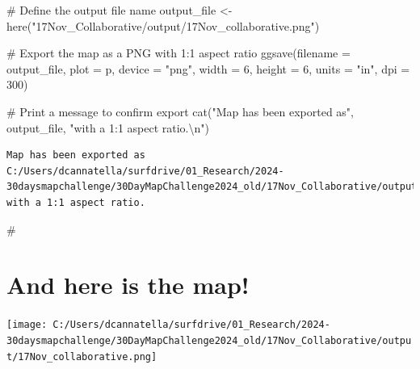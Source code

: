 \documentclass[
  letterpaper,
  DIV=11,
  numbers=noendperiod]{scrartcl}
\newenvironment{Shaded}{\begin{snugshade}}{\end{snugshade}}
\newcommand{\AttributeTok}[1]{\textcolor[rgb]{0.40,0.45,0.13}{#1}}
\newcommand{\CommentTok}[1]{\textcolor[rgb]{0.37,0.37,0.37}{#1}}
\newcommand{\DecValTok}[1]{\textcolor[rgb]{0.68,0.00,0.00}{#1}}
\newcommand{\FunctionTok}[1]{\textcolor[rgb]{0.28,0.35,0.67}{#1}}
\newcommand{\NormalTok}[1]{\textcolor[rgb]{0.00,0.23,0.31}{#1}}
\newcommand{\OtherTok}[1]{\textcolor[rgb]{0.00,0.23,0.31}{#1}}
\newcommand{\SpecialCharTok}[1]{\textcolor[rgb]{0.37,0.37,0.37}{#1}}
\newcommand{\StringTok}[1]{\textcolor[rgb]{0.13,0.47,0.30}{#1}}
\begin{document}
\begin{Shaded}
\begin{Highlighting}[]
\CommentTok{\# Define the output file name}
\NormalTok{output\_file }\OtherTok{\textless{}{-}} \FunctionTok{here}\NormalTok{(}\StringTok{"17Nov\_Collaborative/output/17Nov\_collaborative.png"}\NormalTok{)}

\CommentTok{\# Export the map as a PNG with 1:1 aspect ratio}
\FunctionTok{ggsave}\NormalTok{(}\AttributeTok{filename =}\NormalTok{ output\_file, }\AttributeTok{plot =}\NormalTok{ p, }\AttributeTok{device =} \StringTok{"png"}\NormalTok{, }
       \AttributeTok{width =} \DecValTok{6}\NormalTok{, }\AttributeTok{height =} \DecValTok{6}\NormalTok{, }\AttributeTok{units =} \StringTok{"in"}\NormalTok{, }\AttributeTok{dpi =} \DecValTok{300}\NormalTok{)}

\CommentTok{\# Print a message to confirm export}
\FunctionTok{cat}\NormalTok{(}\StringTok{"Map has been exported as"}\NormalTok{, output\_file, }\StringTok{"with a 1:1 aspect ratio.}\SpecialCharTok{\textbackslash{}n}\StringTok{"}\NormalTok{)}
\end{Highlighting}
\end{Shaded}

\begin{verbatim}
Map has been exported as C:/Users/dcannatella/surfdrive/01_Research/2024-30daysmapchallenge/30DayMapChallenge2024_old/17Nov_Collaborative/output/17Nov_collaborative.png with a 1:1 aspect ratio.
\end{verbatim}

\begin{Shaded}
\begin{Highlighting}[]
\CommentTok{\# }
\end{Highlighting}
\end{Shaded}

\section{And here is the map!}\label{and-here-is-the-map}

\texttt{[image: C:/Users/dcannatella/surfdrive/01\_Research/2024-30daysmapchallenge/30DayMapChallenge2024\_old/17Nov\_Collaborative/output/17Nov\_collaborative.png]}
\end{document}
